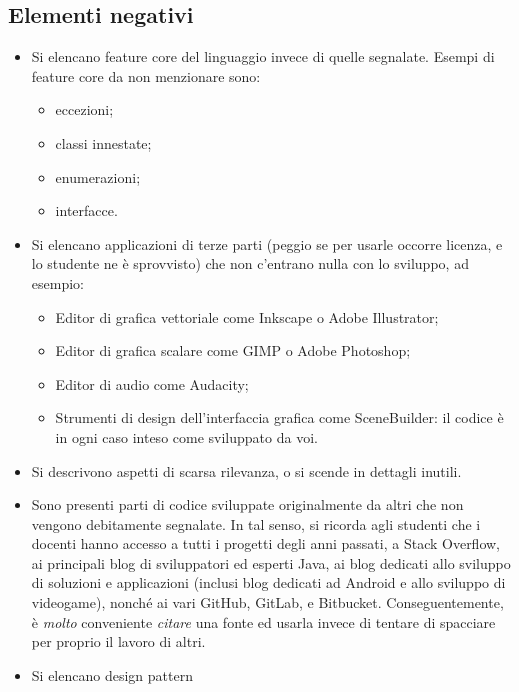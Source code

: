 \documentclass[a4paper,12pt]{report}
\begin{document}
\subsection*{Elementi negativi}
\begin{itemize}
	\item Si elencano feature core del linguaggio invece di quelle segnalate. Esempi di feature core da non menzionare sono:
	      \begin{itemize}
		      \item eccezioni;
		      \item classi innestate;
		      \item enumerazioni;
		      \item interfacce.
	      \end{itemize}
	\item Si elencano applicazioni di terze parti (peggio se per usarle occorre licenza, e lo studente ne è sprovvisto) che non c'entrano nulla con lo sviluppo, ad esempio:
	      \begin{itemize}
		      \item Editor di grafica vettoriale come Inkscape o Adobe Illustrator;
		      \item Editor di grafica scalare come GIMP o Adobe Photoshop;
		      \item Editor di audio come Audacity;
		      \item Strumenti di design dell'interfaccia grafica come SceneBuilder: il codice è in ogni caso inteso come sviluppato da voi.
	      \end{itemize}
	\item Si descrivono aspetti di scarsa rilevanza, o si scende in dettagli inutili.
	\item Sono presenti parti di codice sviluppate originalmente da altri che non vengono debitamente segnalate.
	      In tal senso, si ricorda agli studenti che i docenti hanno accesso a tutti i progetti degli anni passati,
	      a Stack Overflow,
	      ai principali blog di sviluppatori ed esperti Java,
	      ai blog dedicati allo sviluppo di soluzioni e applicazioni
	      (inclusi blog dedicati ad Android e allo sviluppo di videogame),
	      nonché ai vari GitHub, GitLab, e Bitbucket.
	      Conseguentemente, è \emph{molto} conveniente \emph{citare} una fonte ed usarla invece di tentare di spacciare per proprio il lavoro di altri.
	\item Si elencano design pattern
\end{itemize}
\end{document}
